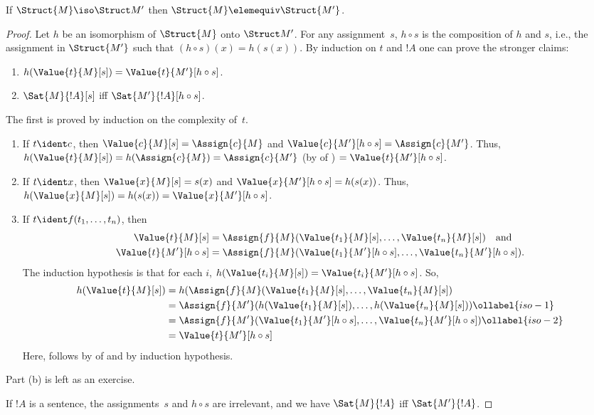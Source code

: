 \documentclass[../../../include/open-logic-section]{subfiles}
\begin{document}
\begin{thm}
If $\Struct{M} \iso \Struct M'$ then $\Struct{M} \elemequiv
\Struct{M'}$.
\end{thm}

\begin{proof}
Let $h$ be an isomorphism of $\Struct{M}$ onto $\Struct M'$. For any
assignment~$s$, $h \circ s$ is the composition of $h$ and $s$, i.e.,
the assignment in $\Struct{M'}$ such that $(h \circ s)(x) = h(s(x))$.
By induction on $t$ and $!A$ one can prove the stronger claims:
\begin{enumerate}
  \item[a.] $h(\Value{t}{M}[s]) = \Value{t}{M'}[h\circ s]$.
  \item[b.] $\Sat{M}{!A}[s]$ iff $\Sat{M'}{!A}[h \circ s]$.
\end{enumerate}
The first is proved by induction on the complexity of~$t$.
\begin{enumerate}
\item If $t \ident c$, then $\Value{c}{M}[s] = \Assign{c}{M}$ and
  $\Value{c}{M'}[h \circ s] = \Assign{c}{M'}$. Thus,
  $h(\Value{t}{M}[s]) = h(\Assign{c}{M}) = \Assign{c}{M'}$ (by
   of ) $=
  \Value{t}{M'}[h \circ s]$.
\item If $t \ident x$, then $\Value{x}{M}[s] = s(x)$ and
  $\Value{x}{M'}[h \circ s] = h(s(x))$. Thus, $h(\Value{x}{M}[s]) =
  h(s(x)) = \Value{x}{M'}[h \circ s]$.
\item If $t \ident f(t_1, \dots, t_n)$, then
  \begin{align*}
    \Value{t}{M}[s] & = \Assign{f}{M}(\Value{t_1}{M}[s], \dots, \Value{t_n}{M}[s]) \quad\text{and}\\
  \Value{t}{M'}[h \circ s] & = \Assign{f}{M}(\Value{t_1}{M'}[h \circ
    s], \dots, \Value{t_n}{M'}[h \circ s]).
  \end{align*}
  The induction hypothesis is that for each $i$, $h(\Value{t_i}{M}[s])
  = \Value{t_i}{M'}[h\circ s]$. So,
  \begin{align}
    h(\Value{t}{M}[s]) 
    & = h(\Assign{f}{M}(\Value{t_1}{M}[s], \dots, \Value{t_n}{M}[s]) \notag\\
    & = \Assign{f}{M'}(h(\Value{t_1}{M}[s]), \dots,
    h(\Value{t_n}{M}[s])) \ollabel{iso-1}\\
    & = \Assign{f}{M'}(\Value{t_1}{M'}[h \circ s], \dots,
    \Value{t_n}{M'}[h \circ s]) \ollabel{iso-2}\\
    & = \Value{t}{M'}[h\circ s] \notag
  \end{align}
  Here,  follows by  of
   and  by induction hypothesis.
\end{enumerate}
Part (b) is left as an exercise.

If $!A$ is a sentence, the assignments~$s$ and $h \circ s$ are
irrelevant, and we have $\Sat{M}{!A}$ iff $\Sat{M'}{!A}$.
\end{proof}
\end{document}
